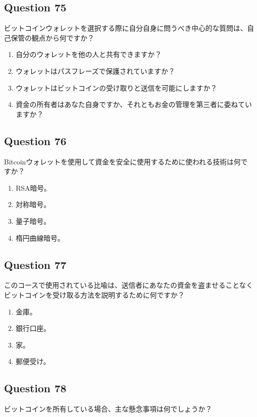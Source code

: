 \documentclass[12pt,a4paper]{article}
\begin{document}
\bigskip


\subsection*{Question 75}
ビットコインウォレットを選択する際に自分自身に問うべき中心的な質問は、自己保管の観点から何ですか？

\begin{enumerate}[label=\Alph*., leftmargin=*]
\item 自分のウォレットを他の人と共有できますか？
\item ウォレットはパスフレーズで保護されていますか？
\item ウォレットはビットコインの受け取りと送信を可能にしますか？
\item 資金の所有者はあなた自身ですか、それともお金の管理を第三者に委ねていますか？
\end{enumerate}

\bigskip


\subsection*{Question 76}
Bitcoinウォレットを使用して資金を安全に使用するために使われる技術は何ですか？

\begin{enumerate}[label=\Alph*., leftmargin=*]
\item RSA暗号。
\item 対称暗号。
\item 量子暗号。
\item 楕円曲線暗号。
\end{enumerate}

\bigskip


\subsection*{Question 77}
このコースで使用されている比喩は、送信者にあなたの資金を盗ませることなくビットコインを受け取る方法を説明するために何ですか？

\begin{enumerate}[label=\Alph*., leftmargin=*]
\item 金庫。
\item 銀行口座。
\item 家。
\item 郵便受け。
\end{enumerate}

\bigskip


\subsection*{Question 78}
ビットコインを所有している場合、主な懸念事項は何でしょうか？
\end{document}
